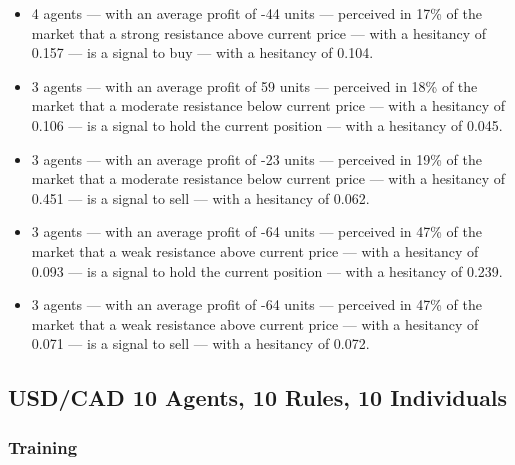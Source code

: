 {\small
  \begin{itemize}
  \item 4 agents — with an average profit of -44 units — perceived in 17\% of
    the market that a strong resistance above current price — with a hesitancy
    of 0.157 — is a signal to buy — with a hesitancy of 0.104.
  \item 3 agents — with an average profit of 59 units — perceived in 18\% of the
    market that a moderate resistance below current price — with a hesitancy of
    0.106 — is a signal to hold the current position — with a hesitancy of
    0.045.
  \item 3 agents — with an average profit of -23 units — perceived in 19\% of
    the market that a moderate resistance below current price — with a hesitancy
    of 0.451 — is a signal to sell — with a hesitancy of 0.062.
  \item 3 agents — with an average profit of -64 units — perceived in 47\% of
    the market that a weak resistance above current price — with a hesitancy of
    0.093 — is a signal to hold the current position — with a hesitancy of
    0.239.
  \item 3 agents — with an average profit of -64 units — perceived in 47\% of
    the market that a weak resistance above current price — with a hesitancy of
    0.071 — is a signal to sell — with a hesitancy of 0.072.
  \end{itemize}
}

\subsection{USD/CAD 10 Agents, 10 Rules, 10 Individuals}
\label{results:interpretation-usd-cad-10agents-10rules-10individuals}


\subsubsection{Training}

